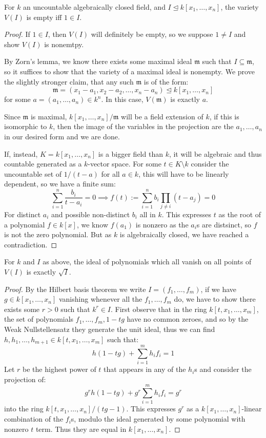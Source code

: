 \documentclass{article}
\begin{document}
\begin{theorem}
    For $k$ an uncountable algebraically closed field, and $I\unlhd k[x_1,\ldots,x_n]$, the variety $V(I)$ is empty iff $1\in I$.
    \begin{proof}
        If $1\in I$, then $V(I)$ will definitely be empty, so we suppose $1\neq I$ and show $V(I)$ is nonemtpy.

        By Zorn's lemma, we know there exists some maximal ideal $\mathfrak{m}$ such that $I\subseteq \mathfrak{m}$, so it suffices to show that the variety of a maximal ideal is nonempty. We prove the slightly stronger claim, that any such $\mathfrak{m}$ is of the form: \[
        \mathfrak{m} = (x_1-a_1,x_2-a_2,\ldots,x_n-a_n) \unlhd k[x_1,\ldots,x_n]
        \] for some $a=(a_1,\ldots,a_n)\in k^n$. In this case, $V(\mathfrak{m})$ is exactly $a$.

        Since $\mathfrak{m}$ is maximal, $k[x_1,\ldots,x_n]/\mathfrak{m}$ will be a field extension of $k$, if this is isomorphic to $k$, then the image of the variables in the projection are the $a_1,\ldots,a_n$ in our desired form and we are done.

        If, instead, $K=k[x_1,\ldots,x_n]$ is a bigger field than $k$, it will be algebraic and thus countable generated as a $k$-vector space. For some $t\in K\setminus k$ consider the uncountable set of $1/(t-a)$ for all $a\in k$, this will have to be linearly dependent, so we have a finite sum: \[
        \sum_{i=1}^n \frac{b_i}{t-a_i}=0 \implies f(t) := \sum_{i=1}^n b_i\prod_{j\neq i}(t-a_j) = 0
        \] For distinct $a_i$ and possible non-distinct $b_i$ all in $k$. This expresses $t$ as the root of a polynomial $f\in k[x]$, we know $f(a_1)$ is nonzero as the $a_i$s are distsinct, so $f$ is not the zero polynomial. But as $k$ is algebraically closed, we have reached a contradiction.
    \end{proof}
\end{theorem}

\begin{theorem}
    For $k$ and $I$ as above, the ideal of polynomials which all vanish on all points of $V(I)$ is exactly $\sqrt{I}$.
    \begin{proof}
        By the Hilbert basis theorem we write $I=(f_1,\ldots,f_m)$, if we have $g\in k[x_1,\ldots,x_n]$ vanishing whenever all the $f_1,\ldots,f_m$ do, we have to show there exists some $r>0$ such that $k^r\in I$. First observe that in the ring $k[t,x_1,\ldots,x_m]$, the set of polynomials $f_1,\ldots,f_m,1-tg$ have no common zeroes, and so by the Weak Nullstellensatz they generate the unit ideal, thus we can find $h,h_1,\ldots,h_{m+1}\in k[t,x_1,\ldots,x_m]$ such that: \[
        h(1-tg) + \sum_{i=1}^mh_if_i=1
        \] Let $r$ be the highest power of $t$ that appears in any of the $h_i$s and consider the projection of: \[
        g^rh(1-tg) + g^r\sum_{i=1}^mh_if_i=g^r
        \] into the ring $k[t,x_1,\ldots,x_n]/(tg-1)$. This expresses $g^r$ as a $k[x_1,\ldots,x_n]$-linear combination of the $f_i$s, modulo the ideal generated by some polynomial with nonzero $t$ term. Thus they are equal in $k[x_1,\ldots,x_n]$.
    \end{proof}
\end{theorem}
\end{document}
